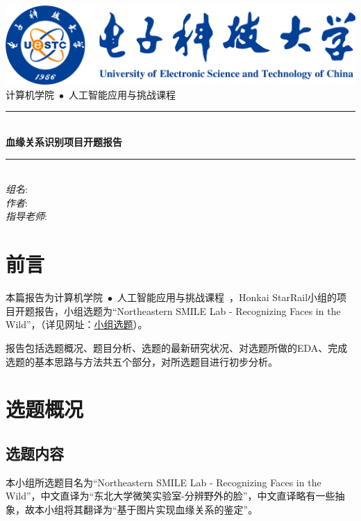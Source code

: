 \documentclass[UTF8]{ctexart}
\newcommand{\HRule}{\rule{\linewidth}{0.5mm}}
\begin{document}
\begin{titlepage}
\begin{center}
\includegraphics[width=\textwidth]{UESTC-Logo}\\[2cm]
\textsc{\LARGE 计算机学院~$\bullet$~人工智能应用与挑战课程~}\\[1.5cm]
\HRule \\[0.4cm]
{ \huge \bfseries 血缘关系识别项目开题报告\\[0.4cm] }

\HRule \\[1.5cm]
\noindent
\emph{组名}:\quad
{}\\
\emph{作者}:\quad
{}\footnotemark
{}\footnotemark
{}\footnotemark\\
\emph{指导老师}:\quad
{}
\end{center}
\end{titlepage}

\tableofcontents
\newpage
\section{前言}
本篇报告为计算机学院~$\bullet$~人工智能应用与挑战课程~，Honkai StarRail小组的项目开题报告，小组选题为“Northeastern SMILE Lab - Recognizing Faces in the Wild”，（详见网址：\href{https://www.kaggle.com/competitions/recognizing-faces-in-the-wild}{小组选题}）。

报告包括选题概况、题目分析、选题的最新研究状况、对选题所做的EDA、完成选题的基本思路与方法共五个部分，对所选题目进行初步分析。
\section{选题概况}
\subsection{选题内容}
本小组所选题目名为“Northeastern SMILE Lab - Recognizing Faces in the Wild”，中文直译为“东北大学微笑实验室-分辨野外的脸”，中文直译略有一些抽象，故本小组将其翻译为“基于图片实现血缘关系的鉴定”。
\end{document}
